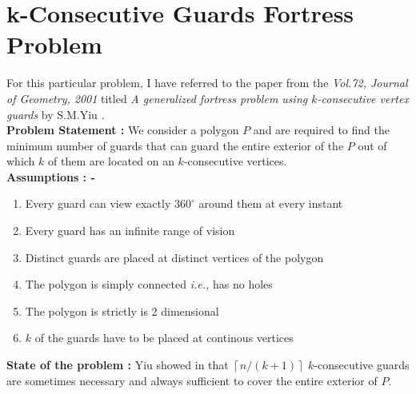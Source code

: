 \documentclass{article}
\begin{document}
\section{k-Consecutive Guards Fortress Problem}

For this particular problem, I have referred to the paper from the \textit{Vol.72, Journal of Geometry, 2001} titled \textit{A generalized fortress problem using $k$-consecutive vertex guards} by S.M.Yiu \cite{yiu2001generalized}. \\

\noindent \textbf{Problem Statement :} We consider a polygon $P$ and are required to find the minimum number of guards that can guard the entire exterior of the $P$ out of which $k$ of them are located on an $k$-consecutive vertices.\\ 

\noindent \textbf{Assumptions : -}

\begin{enumerate}

	\item Every guard can view exactly $360 ^ \circ$ around them at every instant
	
	\item Every guard has an infinite range of vision
	
	 \item Distinct guards are placed at distinct vertices of the polygon
	
	\item The polygon is simply connected \textit{i.e.,} has no holes
	
	\item The polygon is strictly is 2 dimensional
	
	\item $k$ of the guards have to be placed at continous vertices
	
\end{enumerate}

\noindent \textbf{State of the problem :} Yiu showed in \cite{yiu2001generalized} that $\left \lceil n / (k+1) \right \rceil$ $k$-consecutive guards are sometimes necessary and always sufficient to cover the entire exterior of $P$.

\clearpage

\printbibliography
\end{document}
